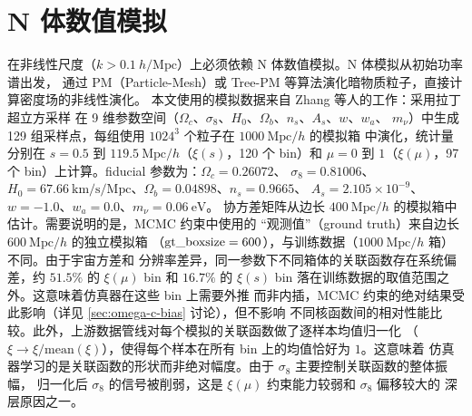 \section{N 体数值模拟}\label{sec:nbody}

在非线性尺度（$k>0.1~h/\mathrm{Mpc}$）上必须依赖 N 体数值模拟。N 体模拟从初始功率谱出发，
通过 PM（Particle-Mesh）或 Tree-PM 等算法演化暗物质粒子，直接计算密度场的非线性演化。
本文使用的模拟数据来自 Zhang 等人\cite{Zhang2023}的工作：采用拉丁超立方采样\cite{McKay1979}
在 9 维参数空间（$\Omega_c$、$\sigma_8$、$H_0$、$\Omega_b$、$n_s$、$A_s$、$w$、$w_a$、
$m_\nu$）中生成 129 组采样点，每组使用 $1024^3$ 个粒子在 $1000~\mathrm{Mpc}/h$ 的模拟箱
中演化，统计量分别在 $s=0.5$ 到 $119.5~\mathrm{Mpc}/h$（$\xi(s)$，120 个 bin）和
$\mu=0$ 到 $1$（$\xi(\mu)$，97 个 bin）上计算。fiducial 参数为：$\Omega_c=0.26072$、
$\sigma_8=0.81006$、$H_0=67.66~\mathrm{km/s/Mpc}$、$\Omega_b=0.04898$、$n_s=0.9665$、
$A_s=2.105\times 10^{-9}$、$w=-1.0$、$w_a=0.0$、$m_\nu=0.06~\mathrm{eV}$。
协方差矩阵从边长 $400~\mathrm{Mpc}/h$ 的模拟箱中估计。需要说明的是，MCMC 约束中使用的
``观测值''（ground truth）来自边长 $600~\mathrm{Mpc}/h$ 的独立模拟箱
（${\rm gt\_boxsize}=600$），与训练数据（$1000~\mathrm{Mpc}/h$ 箱）不同。由于宇宙方差和
分辨率差异，同一参数下不同箱体的关联函数存在系统偏差，约 $51.5\%$ 的 $\xi(\mu)$ bin 和
$16.7\%$ 的 $\xi(s)$ bin 落在训练数据的取值范围之外。这意味着仿真器在这些 bin 上需要外推
而非内插，MCMC 约束的绝对结果受此影响（详见 \autoref{sec:omega-c-bias} 讨论），但不影响
不同核函数间的相对性能比较。此外，上游数据管线对每个模拟的关联函数做了逐样本均值归一化
（$\xi\to\xi/\mathrm{mean}(\xi)$），使得每个样本在所有 bin 上的均值恰好为 $1$。这意味着
仿真器学习的是关联函数的形状而非绝对幅度。由于 $\sigma_8$ 主要控制关联函数的整体振幅，
归一化后 $\sigma_8$ 的信号被削弱，这是 $\xi(\mu)$ 约束能力较弱和 $\sigma_8$ 偏移较大的
深层原因之一。
